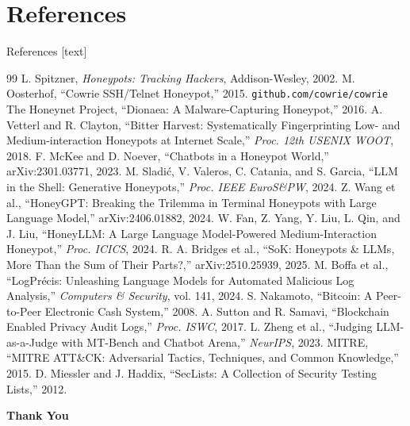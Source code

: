 \documentclass[aspectratio=169, 11pt]{beamer}
\begin{document}
\section{References}
\begin{frame}{References}
    \tiny
    [text]
    \renewcommand{\baselinestretch}{0.88}\selectfont
    \begin{thebibliography}{99}
         L. Spitzner, \textit{Honeypots: Tracking Hackers}, Addison-Wesley, 2002.
         M. Oosterhof, ``Cowrie SSH/Telnet Honeypot,'' 2015. \texttt{github.com/cowrie/cowrie}
         The Honeynet Project, ``Dionaea: A Malware-Capturing Honeypot,'' 2016.
         A. Vetterl and R. Clayton, ``Bitter Harvest: Systematically Fingerprinting Low- and Medium-interaction Honeypots at Internet Scale,'' \textit{Proc. 12th USENIX WOOT}, 2018.
         F. McKee and D. Noever, ``Chatbots in a Honeypot World,'' arXiv:2301.03771, 2023.
         M. Sladi\'{c}, V. Valeros, C. Catania, and S. Garcia, ``LLM in the Shell: Generative Honeypots,'' \textit{Proc. IEEE EuroS\&PW}, 2024.
         Z. Wang et al., ``HoneyGPT: Breaking the Trilemma in Terminal Honeypots with Large Language Model,'' arXiv:2406.01882, 2024.
         W. Fan, Z. Yang, Y. Liu, L. Qin, and J. Liu, ``HoneyLLM: A Large Language Model-Powered Medium-Interaction Honeypot,'' \textit{Proc. ICICS}, 2024.
         R. A. Bridges et al., ``SoK: Honeypots \& LLMs, More Than the Sum of Their Parts?,'' arXiv:2510.25939, 2025.
         M. Boffa et al., ``LogPr\'{e}cis: Unleashing Language Models for Automated Malicious Log Analysis,'' \textit{Computers \& Security}, vol. 141, 2024.
         S. Nakamoto, ``Bitcoin: A Peer-to-Peer Electronic Cash System,'' 2008.
         A. Sutton and R. Samavi, ``Blockchain Enabled Privacy Audit Logs,'' \textit{Proc. ISWC}, 2017.
         L. Zheng et al., ``Judging LLM-as-a-Judge with MT-Bench and Chatbot Arena,'' \textit{NeurIPS}, 2023.
         MITRE, ``MITRE ATT\&CK: Adversarial Tactics, Techniques, and Common Knowledge,'' 2015.
         D. Miessler and J. Haddix, ``SecLists: A Collection of Security Testing Lists,'' 2012.
    \end{thebibliography}
\end{frame}

\begin{frame}
    \centering
    {\Huge \textbf{\textcolor{amritaMaroon}{Thank You}}}
\end{frame}
\end{document}
